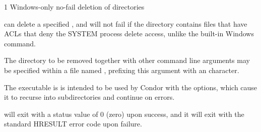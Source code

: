 \begin{ManPage}{\label{man-condor-rmdir}}{1}
{Windows-only no-fail deletion of directories}
\Synopsis
{}




\Description 

 can delete a specified ,
and will not fail if the directory contains files that have ACLs 
that deny the SYSTEM process delete access,
unlike the built-in Windows  command. 

The directory to be removed together with other command line arguments
may be specified within a file named ,
prefixing this argument with an  character.

The  executable is is intended to be used  
by Condor with the    options, 
which cause it to recurse into subdirectories and continue on errors.

\begin{Options}










\end{Options}

\ExitStatus

 will exit with a status value of 0 (zero) upon success,
and it will exit with the standard HRESULT error code upon failure.

\end{ManPage}
